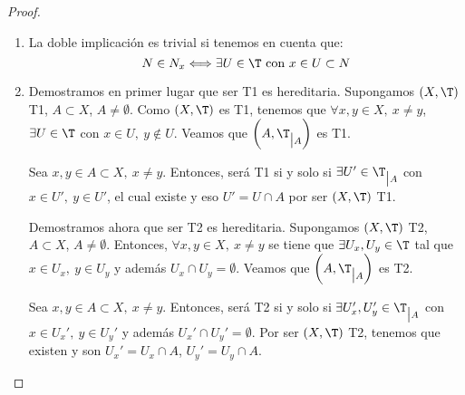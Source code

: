 \begin{proof}
\begin{enumerate}
        \item La doble implicación es trivial si tenemos en cuenta que:
        \begin{equation*}
            N\in N_x\Longleftrightarrow \exists U\in \T \text{ con } x\in U\subset N
        \end{equation*}

        \item Demostramos en primer lugar que ser T1 es hereditaria. Supongamos $(X,\T)$ T1, $A\subset X$, $A\neq \emptyset$. Como $(X,\T)$ es T1, tenemos que $\forall x,y\in X,~x\neq y$, $\exists U\in \T$ con $x\in U,~y\notin U$. Veamos que $\left(A,\T_{\big| A}\right)$ es T1.

        Sea $x,y\in A\subset X,~x\neq y$. Entonces, será T1 si y solo si $\exists U'\in \T_{\big| A}$ con $x\in U',~y\in U'$, el cual existe y eso $U'=U\cap A$ por ser $(X,\T)$ T1.\vspace{1em}

        Demostramos ahora que ser T2 es hereditaria. Supongamos $(X,\T)$ T2, $A\subset X$, $A\neq \emptyset$. Entonces, $\forall x,y\in X,~x\neq y$
        se tiene que $\exists U_x,U_y\in \T$ tal que $x\in U_x,~y\in U_y$ y además $U_x\cap U_y=\emptyset$. Veamos que $\left(A,\T_{\big| A}\right)$ es T2.

        Sea $x,y\in A\subset X,~x\neq y$. Entonces, será T2 si y solo si $\exists U_x',U_y'\in \T_{\big| A}$ con $x\in U_x',~y\in U_y'$ y además $U_x'\cap U_y'=\emptyset$. Por ser $(X,\T)$ T2, tenemos que existen y son $U_x'=U_x\cap A$, $U_y'=U_y\cap A$.
    
        
    \end{enumerate}
\end{proof}


